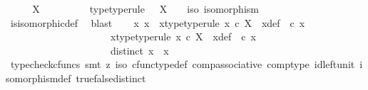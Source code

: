 \begin{isabellebody}
%
\isadelimproof
%
\endisadelimproof
%
\isatagproof
{}\isamarkupfalse%
\ \isanewline
\ \ \isamarkupfalse%
\ {\isachardoublequoteopen}X\ {\isasymcong}\ {\isasymOmega}{\isachardoublequoteclose}\isanewline
\ \ \isamarkupfalse%
\ \isamarkupfalse%
\ {\isasymphi}\ \ {\isasymphi}{\isacharunderscore}{\kern0pt}type{\isacharbrackleft}{\kern0pt}type{\isacharunderscore}{\kern0pt}rule{\isacharbrackright}{\kern0pt}{\isacharcolon}{\kern0pt}\ {\isachardoublequoteopen}{\isasymphi}\ {\isacharcolon}{\kern0pt}\ X\ {\isasymrightarrow}\ {\isasymOmega}{\isachardoublequoteclose}\ \ {\isasymphi}{\isacharunderscore}{\kern0pt}iso{\isacharcolon}{\kern0pt}\ {\isachardoublequoteopen}isomorphism\ {\isasymphi}{\isachardoublequoteclose}\isanewline
\ \ \ \ \isamarkupfalse%
\ is{\isacharunderscore}{\kern0pt}isomorphic{\isacharunderscore}{\kern0pt}def\ \isamarkupfalse%
\ blast\isanewline
\ \ \isamarkupfalse%
\ x{}\ x{}\ \ x{}{\isacharunderscore}{\kern0pt}type{\isacharbrackleft}{\kern0pt}type{\isacharunderscore}{\kern0pt}rule{\isacharbrackright}{\kern0pt}{\isacharcolon}{\kern0pt}\ {\isachardoublequoteopen}x{}\ {\isasymin}\isactrlsub c\ X{\isachardoublequoteclose}\ \ x{}{\isacharunderscore}{\kern0pt}def{\isacharcolon}{\kern0pt}\ {\isachardoublequoteopen}{\isasymphi}\ {\isasymcirc}\isactrlsub c\ x{}\ {\isacharequal}{\kern0pt}\ {\isasymt}{\isachardoublequoteclose}\ \isanewline
\ \ \ \ \ \ \ \ \ \ \ \ \ \ \ \ \ \ \ \ \ x{}{\isacharunderscore}{\kern0pt}type{\isacharbrackleft}{\kern0pt}type{\isacharunderscore}{\kern0pt}rule{\isacharbrackright}{\kern0pt}{\isacharcolon}{\kern0pt}\ {\isachardoublequoteopen}x{}\ {\isasymin}\isactrlsub c\ X{\isachardoublequoteclose}\ \ x{}{\isacharunderscore}{\kern0pt}def{\isacharcolon}{\kern0pt}\ {\isachardoublequoteopen}{\isasymphi}\ {\isasymcirc}\isactrlsub c\ x{}\ {\isacharequal}{\kern0pt}\ {\isasymf}{\isachardoublequoteclose}\ \isanewline
\ \ \ \ \ \ \ \ \ \ \ \ \ \ \ \ \ \ \ \ \ distinct{\isacharcolon}{\kern0pt}\ {\isachardoublequoteopen}x{}\ {\isasymnoteq}\ x{}{\isachardoublequoteclose}\isanewline
\ \ \ \ \isamarkupfalse%
\ {\isacharparenleft}{\kern0pt}typecheck{\isacharunderscore}{\kern0pt}cfuncs{\isacharcomma}{\kern0pt}\ smt\ {\isacharparenleft}{\kern0pt}z{}{\isacharparenright}{\kern0pt}\ {\isasymphi}{\isacharunderscore}{\kern0pt}iso\ cfunc{\isacharunderscore}{\kern0pt}type{\isacharunderscore}{\kern0pt}def\ comp{\isacharunderscore}{\kern0pt}associative\ comp{\isacharunderscore}{\kern0pt}type\ id{\isacharunderscore}{\kern0pt}left{\isacharunderscore}{\kern0pt}unit{}\ isomorphism{\isacharunderscore}{\kern0pt}def\ true{\isacharunderscore}{\kern0pt}false{\isacharunderscore}{\kern0pt}distinct{\isacharparenright}{\kern0pt}\isanewline

\end{isabellebody}

